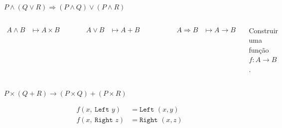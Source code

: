 \documentclass{beamer}
\begin{document}
\begin{frame}{$P \land (Q \lor R) \Rightarrow (P \land Q) \lor (P \land R) $}

\begin{columns}
\centering

\begin{align*}
A \land B &\longmapsto A \times B
\end{align*}

\begin{prooftree}
\end{prooftree}


\begin{align*}
A \lor B &\longmapsto A + B
\end{align*}

\begin{prooftree}
\end{prooftree}

\begin{prooftree}
\end{prooftree}


\begin{align*}
A \Rightarrow B &\longmapsto A \rightarrow B
\end{align*}

Construir uma função $f : A \rightarrow B$.

\end{columns}

\end{frame}


\begin{frame}{$P \times (Q + R) \rightarrow (P \times Q) + (P \times R) $}

\begin{align*}
f (x, ~\texttt{Left } y) &= \texttt{Left } (x, y)\\
f (x, ~\texttt{Right } z) &= \texttt{Right } (x, z) 
\end{align*}

\end{frame}


\end{document}
